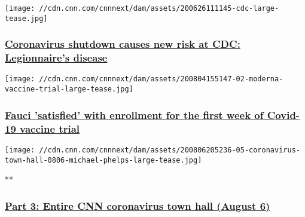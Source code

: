 \href{/2020/08/07/health/coronavirus-legionnaires-water-cdc/index.html}{}

\texttt{[image: //cdn.cnn.com/cnnnext/dam/assets/200626111145-cdc-large-tease.jpg]}

\hypertarget{coronavirus-shutdown-causes-new-risk-at-cdc-legionnaires-disease--1}{%
\subsubsection{\texorpdfstring{\href{/2020/08/07/health/coronavirus-legionnaires-water-cdc/index.html}{Coronavirus
shutdown causes new risk at CDC: Legionnaire's disease
}}{Coronavirus shutdown causes new risk at CDC: Legionnaire's disease }}\label{coronavirus-shutdown-causes-new-risk-at-cdc-legionnaires-disease--1}}

\href{/2020/08/06/health/coronavirus-moderna-volunteers-fauci-satisfied/index.html}{}

\texttt{[image: //cdn.cnn.com/cnnnext/dam/assets/200804155147-02-moderna-vaccine-trial-large-tease.jpg]}

\hypertarget{fauci-satisfied-with-enrollment-for-the-first-week-of-covid-19-vaccine-trial--1}{%
\subsubsection{\texorpdfstring{\href{/2020/08/06/health/coronavirus-moderna-volunteers-fauci-satisfied/index.html}{Fauci
'satisfied' with enrollment for the first week of Covid-19 vaccine trial
}}{Fauci 'satisfied' with enrollment for the first week of Covid-19 vaccine trial }}\label{fauci-satisfied-with-enrollment-for-the-first-week-of-covid-19-vaccine-trial--1}}

\href{/videos/health/2020/08/06/entire-august-6-coronavirus-town-hall-part-3-sot-vpx.cnn}{}

\texttt{[image: //cdn.cnn.com/cnnnext/dam/assets/200806205236-05-coronavirus-town-hall-0806-michael-phelps-large-tease.jpg]}

**

\hypertarget{part-3-entire-cnn-coronavirus-town-hall-august-6}{%
\subsubsection{\texorpdfstring{\href{/videos/health/2020/08/06/entire-august-6-coronavirus-town-hall-part-3-sot-vpx.cnn}{Part
3: Entire CNN coronavirus town hall (August
6)}}{Part 3: Entire CNN coronavirus town hall (August 6)}}\label{part-3-entire-cnn-coronavirus-town-hall-august-6}}

